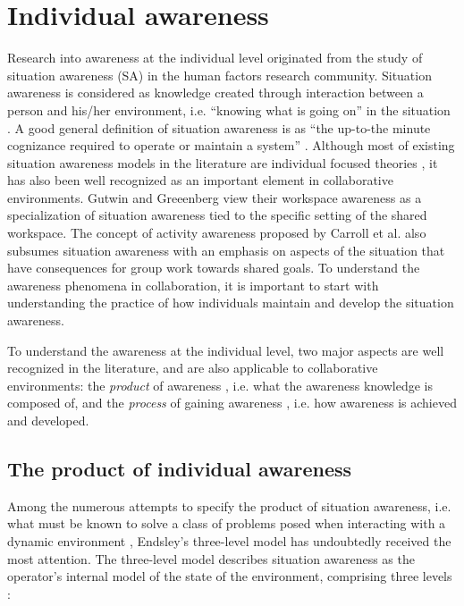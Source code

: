 \section{Individual awareness}
\label{sec:awareness_in_individuals}
Research into awareness at the individual level originated from the study of situation awareness (SA) in the human factors research community. Situation awareness is considered as knowledge created through interaction between a person and his/her environment, i.e. ``knowing what is going on'' in the situation \cite{Endsley1995}. A good general definition of situation awareness is as ``the up-to-the minute cognizance required to operate or maintain a system'' \cite{Adams1995}. Although most of existing situation awareness models in the literature are individual focused theories \cite{Salmon2008}, it has also been well recognized as an important element in collaborative environments. Gutwin and Greeenberg \cite{Gutwin2002} view their workspace awareness as a specialization of situation awareness tied to the specific setting of the shared workspace. The concept of activity awareness proposed by Carroll et al. \cite{carroll2003a} also subsumes situation awareness with an emphasis on aspects of the situation that have consequences for group work towards shared goals. To understand the awareness phenomena in collaboration, it is important to start with understanding the practice of how individuals maintain and develop the situation awareness.

To understand the awareness at the individual level, two major aspects are well recognized in the literature, and are also applicable to collaborative environments: the \emph{product} of awareness \cite{Endsley1995}, i.e. what the awareness knowledge is composed of, and the \emph{process} of gaining awareness \cite{Adams1995}, i.e. how awareness is achieved and developed.

\subsection{The product of individual awareness} %
\label{sub:awareness_as_product}
Among the numerous attempts to specify the product of situation awareness, i.e. what must be known to solve a class of problems posed when interacting with a dynamic environment \cite{Salmon2008}, Endsley's three-level model \cite{Endsley1995} has undoubtedly received the most attention. The three-level model describes situation awareness as the operator's internal model of the state of the environment, comprising three levels \cite{Endsley1995}:

